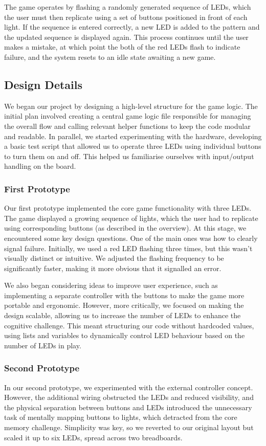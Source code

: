 \documentclass[11pt]{article}
\begin{document}
The game operates by flashing a randomly generated sequence of LEDs, which the user must then replicate using a set of buttons positioned in front of each light. If the sequence is entered correctly, a new LED is added to the pattern and the updated sequence is displayed again. This process continues until the user makes a mistake, at which point the both of the red LEDs flash to indicate failure, and the system resets to an idle state awaiting a new game.

\subsection{Design Details} 
We began our project by designing a high-level structure for the game logic. The initial plan involved creating a central game logic file responsible for managing the overall flow and calling relevant helper functions to keep the code modular and readable. In parallel, we started experimenting with the hardware, developing a basic test script that allowed us to operate three LEDs using individual buttons to turn them on and off. This helped us familiarise ourselves with input/output handling on the board.

\subsubsection{First Prototype}
Our first prototype implemented the core game functionality with three LEDs. The game displayed a growing sequence of lights, which the user had to replicate using corresponding buttons  (as described in the overview). At this stage, we encountered some key design questions. One of the main ones was how to clearly signal failure. Initially, we used a red LED flashing three times, but this wasn’t visually distinct or intuitive. We adjusted the flashing frequency to be significantly faster, making it more obvious that it signalled an error.

We also began considering ideas to improve user experience, such as implementing a separate controller with the buttons to make the game more portable and ergonomic. However, more critically, we focused on making the design scalable, allowing us to increase the number of LEDs to enhance the cognitive challenge. This meant structuring our code without hardcoded values, using lists and variables to dynamically control LED behaviour based on the number of LEDs in play.

\subsubsection{Second Prototype}
In our second prototype, we experimented with the external controller concept. However, the additional wiring obstructed the LEDs and reduced visibility, and the physical separation between buttons and LEDs introduced the unnecessary task of mentally mapping buttons to lights, which detracted from the core memory challenge. Simplicity was key, so we reverted to our original layout but scaled it up to six LEDs, spread across two breadboards.
\end{document}
